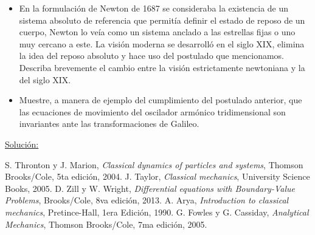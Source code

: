 \documentclass[a4paper,10pt]{article}
\begin{document}
\begin{itemize}
 \item En la formulación de Newton de 1687 se consideraba la existencia de un sistema 
 absoluto de referencia que permitía definir el estado de reposo de un cuerpo, Newton lo
 veía como un sistema anclado a las estrellas fijas o uno muy cercano a este. La visión 
 moderna se desarrolló en el siglo XIX, elimina la idea del reposo absoluto y hace 
 uso del postulado que mencionamos. Describa brevemente el cambio entre la visión 
 estrictamente newtoniana y la del siglo XIX.
 \item Muestre, a manera de ejemplo del cumplimiento del postulado anterior, que las 
 ecuaciones de movimiento del oscilador armónico tridimensional son invariantes ante
 las transformaciones de Galileo.
\end{itemize}

\vspace{.3cm}

\underline{Solución:}

\vspace{.3cm}

\begin{thebibliography}{10}
 S. Thronton y J. Marion, \textit{Classical dynamics of particles and systems}, Thomson Brooks/Cole,
 5ta edición, 2004.
 J. Taylor, \textit{Classical mechanics}, University Science Books, 2005.
 D. Zill y W. Wright, \textit{Differential equations with Boundary-Value Problems}, Brooks/Cole,
 8va edición, 2013.
 A. Arya, \textit{Introduction to classical mechanics}, Pretince-Hall, 1era Edición,
 1990.
 G. Fowles y G. Cassiday, \emph{Analytical Mechanics}, Thomson Brooks/Cole, 
 7ma edición, 2005.
\end{thebibliography}
\end{document}
